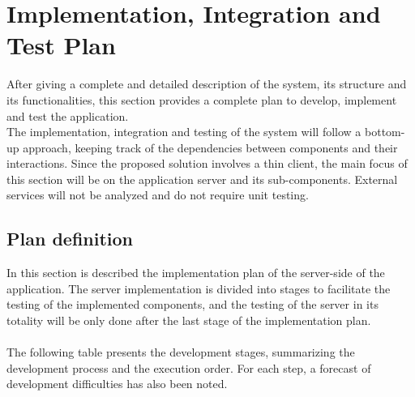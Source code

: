 \documentclass[10pt]{article} %
\begin{document}
\section{Implementation, Integration and Test Plan}
After giving a complete and detailed description of the system, its structure and its functionalities, this section provides a complete plan to develop, implement and test the application.\\
The implementation, integration and testing of the system will follow a bottom-up approach, keeping track of the dependencies between components and their interactions.
Since the proposed solution involves a thin client, the main focus of this section will be on the application server and its sub-components. External services will not be analyzed and do not
require unit testing.
\subsection{Plan definition}
In this section is described the implementation plan of the server-side of the application. The server implementation is divided into stages to facilitate the testing of the implemented components, and the 
testing of the server in its totality will be only done after the last stage of the implementation plan.\\\\
The following table presents the development stages, summarizing the development process and the execution order. For each step, a forecast of development difficulties has also been noted.\\
\end{document}
